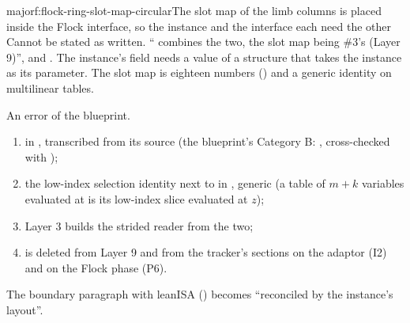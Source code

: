 \begin{finding}{major}{f:flock-ring-slot-map-circular}{The slot map of the limb columns is placed
inside the Flock interface, so the instance and the interface each need the other}
 Cannot be stated as written.  \enquote{
combines the two, the slot map being \#3's  (Layer 9)}, and
 . The instance's 
field needs a value of a structure that takes the instance as its parameter. The slot map is
eighteen numbers () and a generic identity on multilinear tables.

 An error of the blueprint.

\begin{enumerate}[label=(\alph*)]
\item {} in , transcribed from
  its source (the blueprint's Category B: , cross-checked with
  );
\item the low-index selection identity next to  in
  , generic (a table of $m + k$ variables evaluated at
   is its low-index slice evaluated at $z$);
\item Layer 3 builds the strided reader from the two;
\item {} is deleted from Layer 9 and from the tracker's sections on the adaptor
  (I2) and on the Flock phase (P6).
\end{enumerate}
The boundary paragraph with leanISA () becomes \enquote{reconciled by the
instance's layout}.
\end{finding}


